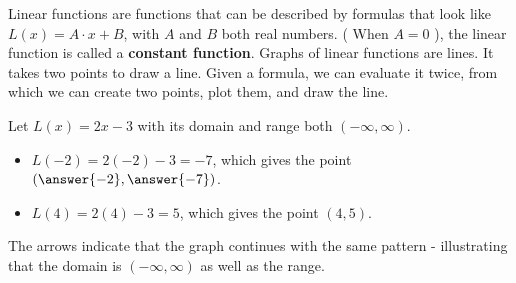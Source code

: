 \documentclass{ximera}
\begin{document}
\begin{example}

Linear functions are functions that can be described by formulas that look like $L(x) = A \cdot x + B$, with $A$ and $B$ both real numbers. ( When $A = 0$ ), the linear function is called a \textbf{constant function}.   Graphs of linear functions are lines.  It takes two points to draw a line. Given a formula, we can evaluate it twice, from which we can create two points, plot them, and draw the line.

Let $L(x) = 2x-3$ with its domain and range both $(-\infty, \infty)$.

\begin{itemize}
\item $L(-2) = 2(-2) - 3 = -7$, which gives the point $\left(\answer{-2}, \answer{-7}\right)$.
\item $L(4) = 2(4) - 3 = 5$, which gives the point $(4, 5)$.
\end{itemize}






\begin{image}
\end{image}

The arrows indicate that the graph continues with the same pattern - illustrating that the domain is $(-\infty, \infty)$ as well as the range.


\end{example}
\end{document}
